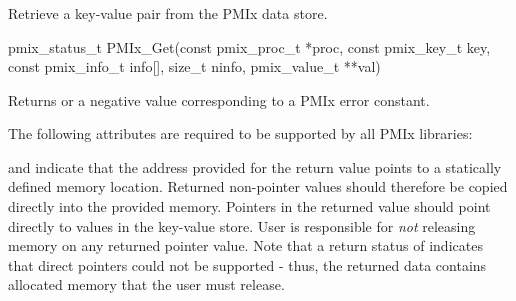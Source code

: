 \subsubsection{}

\summary

Retrieve a key-value pair from the \ac{PMIx} data store.

\format

\cspecificstart
\begin{codepar}
pmix_status_t
PMIx_Get(const pmix_proc_t *proc, const pmix_key_t key,
         const pmix_info_t info[], size_t ninfo,
         pmix_value_t **val)
\end{codepar}
\cspecificend

\begin{arglist}
\end{arglist}

Returns  or a negative value corresponding to a PMIx error constant.

\reqattrstart
The following attributes are required to be supported by all \ac{PMIx} libraries:

and indicate that the address provided for the return value points to a statically defined memory location. Returned non-pointer values should therefore be copied directly into the provided memory. Pointers in the returned value should point directly to values in the key-value store. User is responsible for \emph{not} releasing memory on any returned pointer value. Note that a return status of  indicates that direct pointers could not be supported - thus, the returned data contains allocated memory that the user must release.
\pastePRIAttributeItemEnd

\reqattrend

